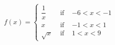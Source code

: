 {${\displaystyle f(x) = \left\{ \begin{array}{rcl} \dfrac{1}{x} & \mbox{ if } & -6 < x < -1\\
                                                                  x & \mbox{ if } & -1 < x < 1 \\
                                                           \sqrt{x} & \mbox{ if } & 1 < x < 9  
                                     \end{array} \right. }$}
{
\begin{center}
\end{center}
}